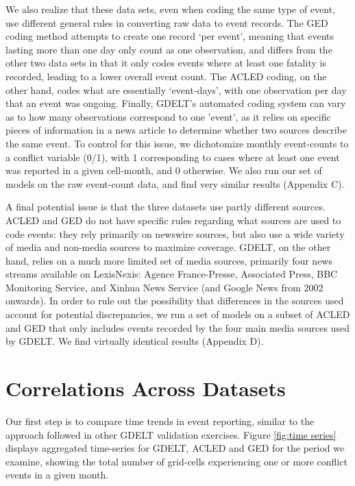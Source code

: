 \documentclass[hidelinks]{article}
\begin{document}
We also realize that these data sets, even when coding the same type of event, use different general rules in converting raw data to event records. The GED coding method attempts to create one record `per event', meaning that events lasting more than one day only count as one observation, and differs from the other two data sets in that it only codes events where at least one fatality is recorded, leading to a lower overall event count. The ACLED coding, on the other hand, codes what are essentially `event-days', with one observation per day that an event was ongoing. Finally, GDELT's automated coding system can vary as to how many observations correspond to one 'event', as it relies on specific pieces of information in a news article to determine whether two sources describe the same event. To control for this issue, we dichotomize monthly event-counts to a conflict variable (0/1), with 1 corresponding to cases where at least one event was reported in a given cell-month, and 0 otherwise. We also run our set of models on the raw event-count data, and find very similar results (Appendix C).

A final potential issue is that the three datasets use partly different sources. ACLED and GED do not have specific rules regarding what sources are used to code events: they rely primarily on newswire sources, but also use a wide variety of media and non-media sources to maximize coverage. GDELT, on the other hand, relies on a much more limited set of media sources, primarily four news streams available on LexisNexis: Agence France-Presse, Associated Press, BBC Monitoring Service, and Xinhua News Service (and Google News from 2002 onwards). In order to rule out the possibility that differences in the sources used account for potential discrepancies, we run a set of models on a subset of ACLED and GED that only includes events recorded by the four main media sources used by GDELT. We find virtually identical results (Appendix D).

\section*{Correlations Across Datasets}

Our first step is to compare time trends in event reporting, similar to the approach followed in other GDELT validation exercises. Figure \ref{fig:time series} displays aggregated time-series for GDELT, ACLED and GED for the period we examine, showing the total number of grid-cells experiencing one or more conflict events in a given month.
\end{document}
